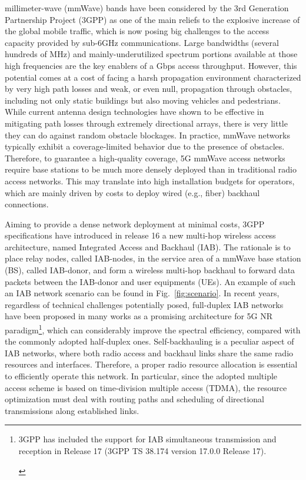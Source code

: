  millimeter-wave (mmWave) bands have been considered by the 3rd Generation Partnership Project (3GPP) as one of the main reliefs to the explosive increase of the global mobile traffic, which is now posing big challenges to the access capacity provided by sub-6GHz communications.
Large bandwidths (several hundreds of MHz) and mainly-underutilized spectrum portions available at those high frequencies are the key enablers of a Gbps access throughput.
However, this potential comes at a cost of facing a harsh propagation environment characterized by very high path losses and weak, or even null, propagation through obstacles, including not only static buildings but also moving vehicles and pedestrians. While current antenna design technologies have shown to be effective in mitigating path losses through extremely directional arrays, there is very little they can do against random obstacle blockages. In practice, mmWave networks typically exhibit a coverage-limited behavior due to the presence of obstacles. Therefore, to guarantee a high-quality coverage, 5G mmWave access networks require base stations to be much more densely deployed than in traditional radio access networks. This may translate into high installation budgets for operators, which are mainly driven by costs to deploy wired (e.g., fiber) backhaul connections.

Aiming to provide a dense network deployment at minimal costs, 3GPP specifications have introduced in release 16 a new multi-hop wireless access architecture, named Integrated Access and Backhaul (IAB)\cite{3gpp15study}. The rationale is to place relay nodes, called IAB-nodes, in the service area of a mmWave base station (BS), called IAB-donor, and form a wireless multi-hop backhaul to forward data packets between the IAB-donor and user equipments (UEs). An example of such an IAB network scenario can be found in Fig.~\ref{fig:scenario}.
In recent years, regardless of technical challenges potentially posed, full-duplex IAB networks have been proposed in many works \cite{9770117,9363025} as a promising architecture for 5G NR paradigm\footnote{\begin{changed}3GPP has included the support for IAB simultaneous transmission and reception in Release 17 (3GPP TS 38.174 version 17.0.0 Release 17).\end{changed}}, which can considerably improve the spectral efficiency, compared with the commonly adopted half-duplex ones.
Self-backhauling is a peculiar aspect of IAB networks, where both radio access and backhaul links share the same radio resources and interfaces. Therefore, a proper radio resource allocation is essential to efficiently operate this network. In particular, since the adopted multiple access scheme is based on time-division multiple access (TDMA), the resource optimization must deal with routing paths and scheduling of directional transmissions along established links.


